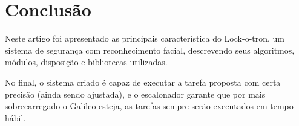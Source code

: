 \documentclass[12pt]{article}
\begin{document}
\section{Conclusão}
    Neste artigo foi apresentado as principais característica do Lock-o-tron, um
    sistema de segurança com reconhecimento facial, descrevendo seus algoritmos,
    módulos, disposição e bibliotecas utilizadas.

    No final, o sistema criado é capaz de executar a tarefa proposta com certa
    precisão (ainda sendo ajustada), e o escalonador garante que por mais
    sobrecarregado o Galileo esteja, as tarefas sempre serão executados em tempo
    hábil.

% 
% 
\end{document}
